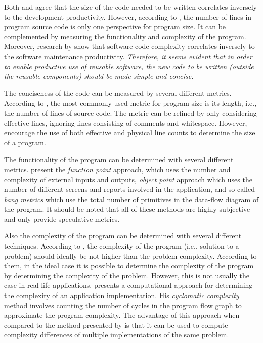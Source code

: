 Both \citet{frakes_software_1996} and \citet{mohagheghi_quality_2007} agree that the size of the code needed to be written correlates inversely to the development productivity. However, according to \citet{fenton_software_1998}, the number of lines in program source code is only one perspective for program size. It can be complemented by measuring the functionality and complexity of the program. Moreover, research by \citet{banker_software_1993,gill_cyclomatic_1991} show that software code complexity correlates inversely to the software maintenance productivity. \emph{Therefore, it seems evident that in order to enable productive use of reusable software, the new code to be written (outside the reusable components) should be made simple and concise.}

The conciseness of the code can be measured by several different metrics. According to \citet{fenton_software_1998}, the most commonly used metric for program size is its length, i.e., the number of lines of source code. The metric can be refined by only considering effective lines, ignoring lines consisting of comments and whitespace. However, \citet{fenton_software_1998} encourage the use of both effective and physical line counts to determine the size of a program.

The functionality of the program can be determined with several different metrics. \citet{fenton_software_1998} present the \emph{function point} approach, which uses the number and complexity of external inputs and outputs, \emph{object point} approach which uses the number of different screens and reports involved in the application, and so-called \emph{bang metrics} which use the total number of primitives in the data-flow diagram of the program. It should be noted that all of these methods are highly subjective and only provide speculative metrics.

Also the complexity of the program can be determined with several different techniques. According to \citet{fenton_software_1998}, the complexity of the program (i.e., solution to a problem) should ideally be not higher than the problem complexity. According to them, in the ideal case it is possible to determine the complexity of the program by determining the complexity of the problem. However, this is not usually the case in real-life applications. \citet{mccabe_complexity_1976} presents a computational approach for determining the complexity of an application implementation. His \emph{cyclomatic complexity} method involves counting the number of cycles in the program flow graph to approximate the program complexity. The advantage of this approach when compared to the method presented by \citet{fenton_software_1998} is that it can be used to compute complexity differences of multiple implementations of the same problem.

